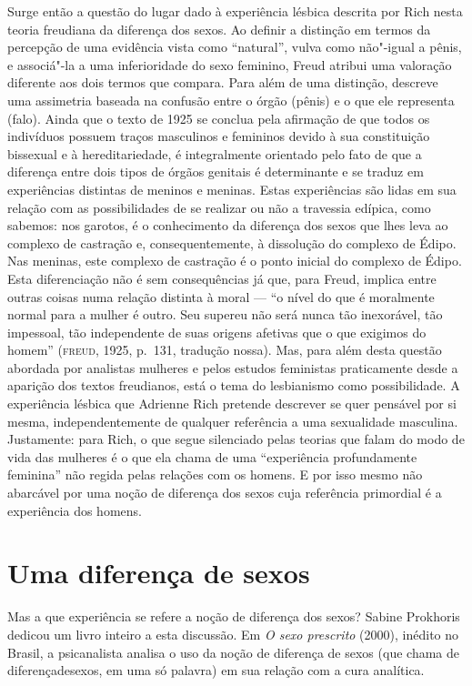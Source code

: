 Surge então a questão do lugar dado à experiência lésbica descrita por
Rich nesta teoria freudiana da diferença dos sexos. Ao definir a
distinção em termos da percepção de uma evidência vista como
``natural'', vulva como não"-igual a pênis, e associá"-la a uma
inferioridade do sexo feminino, Freud atribui uma valoração diferente
aos dois termos que compara. Para além de uma distinção, descreve uma
assimetria baseada na confusão entre o órgão (pênis) e o que ele
representa (falo). Ainda que o texto de 1925 se conclua pela afirmação
de que todos os indivíduos possuem traços masculinos e femininos devido
à sua constituição bissexual e à hereditariedade, é integralmente
orientado pelo fato de que a diferença entre dois tipos de órgãos genitais
é determinante e se traduz em experiências distintas de meninos e
meninas. Estas experiências são lidas em sua relação com as
possibilidades de se realizar ou não a travessia edípica, como sabemos:
nos garotos, é o conhecimento da diferença dos sexos que lhes leva ao
complexo de castração e, consequentemente, à dissolução do complexo de
Édipo. Nas meninas, este complexo de castração é o ponto inicial do
complexo de Édipo. Esta diferenciação não é sem consequências já que,
para Freud, implica entre outras coisas numa relação distinta à moral ---
``o nível do que é moralmente normal para a mulher é outro. Seu supereu
não será nunca tão inexorável, tão impessoal, tão independente de suas
origens afetivas que o que exigimos do homem'' (\textsc{freud}, 1925, p.~131, tradução nossa).
Mas, para além desta
questão abordada por analistas mulheres e pelos estudos feministas
praticamente desde a aparição dos textos freudianos, está o tema do
lesbianismo como possibilidade. A experiência lésbica que Adrienne Rich
pretende descrever se quer pensável por si mesma, independentemente de
qualquer referência a uma sexualidade masculina. Justamente: para Rich,
o que segue silenciado pelas teorias que falam do modo de vida das
mulheres é o que ela chama de uma ``experiência profundamente feminina''
não regida pelas relações com os homens. E por isso mesmo não abarcável
por uma noção de diferença dos sexos cuja referência primordial é a
experiência dos homens.

\section{Uma diferença de sexos}

Mas a que experiência se refere a noção de diferença dos sexos? Sabine
Prokhoris dedicou um livro inteiro a esta discussão. Em \emph{O sexo
prescrito} (2000), inédito
no Brasil, a psicanalista analisa o uso da noção de diferença de sexos
(que chama de diferençadesexos, em uma só palavra) em sua relação com a
cura analítica.

